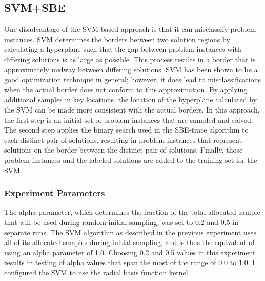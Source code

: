 \subsection{SVM+SBE} 

One disadvantage of the SVM-based approach is that it can misclassify problem instances.  SVM determines the borders between two solution regions by calculating a hyperplane such that the gap between problem instances with differing solutions is as large as possible.  This process results in a border that is approximately midway between differing solutions.  SVM has been shown to be a good optimization technique in general; however, it does lead to misclassifications when the actual border does not conform to this approximation.  By applying additional samples in key locations, the location of the hyperplane calculated by the SVM can be made more consistent with the actual borders.  In this approach, the first step is an initial set of problem instances that are sampled and solved. The second step applies the binary search used in the SBE-trace algorithm to each distinct pair of solutions, resulting in problem instances that represent solutions on the border between the distinct pair of solutions.  Finally, those problem instances and the labeled solutions are added to the training set for the SVM. 

\subsubsection{Experiment Parameters} 

The alpha parameter, which determines the fraction of the total allocated sample that will be used during random initial sampling, was set to 0.2 and 0.5 in separate runs.  The SVM algorithm as described in the previous experiment uses all of its allocated samples during initial sampling, and is thus the equivalent of using an alpha parameter of 1.0.  Choosing 0.2 and 0.5 values in this experiment results in testing of alpha values that span the most of the range of 0.0 to 1.0.  I configured the SVM to use the radial basis function kernel.

